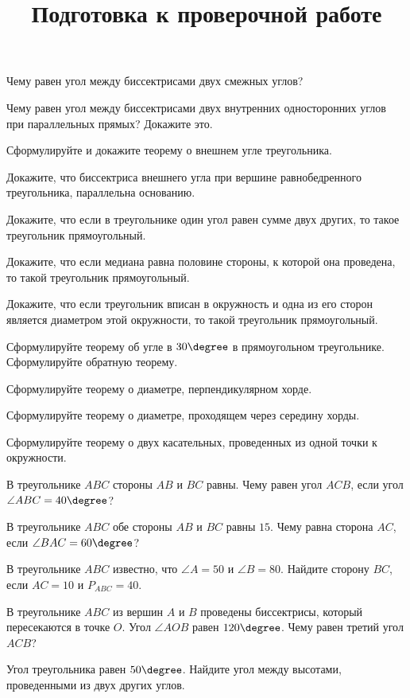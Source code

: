 \newpage
\title{Подготовка к проверочной работе}
\begin{listofex}
	\item Чему равен угол между биссектрисами двух смежных углов?
	\item Чему равен угол между биссектрисами двух внутренних односторонних углов при параллельных прямых? Докажите это.
	\item Сформулируйте и докажите теорему о внешнем угле треугольника.
	\item Докажите, что биссектриса внешнего угла при вершине равнобедренного треугольника, параллельна основанию.
	\item Докажите, что если в треугольнике один угол равен сумме двух других, то такое треугольник прямоугольный.
	\item Докажите, что если медиана равна половине стороны, к которой она проведена, то такой треугольник прямоугольный.
	\item Докажите, что если треугольник вписан в окружность и одна из его сторон является диаметром этой окружности, то такой треугольник прямоугольный.
	\item Сформулируйте теорему об угле в \( 30\degree \) в прямоугольном треугольнике. Сформулируйте обратную теорему.
	\item Сформулируйте теорему о диаметре, перпендикулярном хорде.
	\item Сформулируйте теорему о диаметре, проходящем через середину хорды.
	\item Сформулируйте теорему о двух касательных, проведенных из одной точки к окружности.
	\item {}
	\item В треугольнике \( ABC \) стороны \( AB \) и \( BC \) равны. Чему равен угол \( ACB \), если угол \( \angle ABC = 40\degree \)?
	\item В треугольнике \( ABC \) обе стороны \( AB \) и \( BC \) равны \( 15 \). Чему равна сторона \( AC \), если \( \angle BAC = 60 \degree \)?
	\item В треугольнике \( ABC \) известно, что \( \angle A = 50 \) и \( \angle B = 80 \). Найдите сторону \( BC \), если \( AC = 10 \) и \( P_{ABC}=40 \).
	\item В треугольнике \( ABC \) из вершин \( A \) и \( B \) проведены биссектрисы, который пересекаются в точке \( O \). Угол \( \angle AOB \) равен \( 120\degree \). Чему равен третий угол \( ACB \)?
	\item Угол треугольника равен \( 50\degree \). Найдите угол между высотами, проведенными из двух других углов.
	\item {}
	\item {}
	\item {}
	\item {}
	\item {}
\end{listofex}
